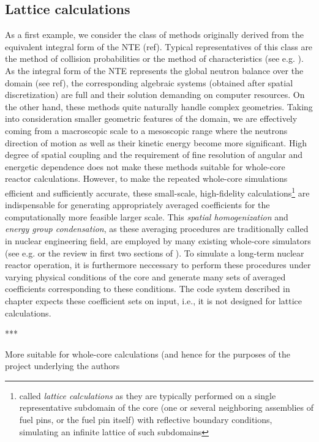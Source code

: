 \subsection{Lattice calculations}
As a first example, we consider the class of
methods originally derived from the equivalent integral form of the NTE (\alert{ref}). Typical representatives of this
class are the method of collision probabilities or the method of characteristics (see e.g.
\cite{Cho2,Wu1,Hursin1,Petkov1,Sanchez1}). As the integral form of the NTE represents the global neutron balance over
the domain (see \alert{ref}), the corresponding algebraic systems (obtained after spatial discretization) are full and
their solution demanding on computer resources. On the other hand, these methods quite naturally handle complex
geometries. Taking into consideration smaller geometric features of the domain, we are effectively coming from a
macroscopic scale to a mesoscopic range where the neutrons direction of motion as well as their kinetic energy become
more significant. High degree of spatial coupling and the requirement of fine resolution of angular and energetic
dependence does not make these methods suitable for whole-core reactor calculations.
However, to make the repeated whole-core simulations efficient and sufficiently accurate, these small-scale,
high-fidelity calculations\footnote{called \textit{lattice calculations} as they are typically performed on a single
representative subdomain of the core (one or several neighboring assemblies of fuel pins, or the fuel pin itself)
with reflective boundary conditions, simulating an infinite lattice of such subdomains} are indispensable for
generating appropriately averaged coefficients for the computationally more feasible larger scale.
This \textit{spatial homogenization} and \textit{energy group condensation}, as these averaging procedures are
traditionally called in nuclear engineering field, are employed by many existing whole-core simulators (see e.g.
\cite[Chap. 17]{Reuss1} or the review in first two sections of \cite{Sanchez7}). To simulate a long-term nuclear reactor
operation, it is furthermore neccessary to perform these procedures under varying physical conditions of the core and
generate many sets of averaged coefficients corresponding to these conditions. The code system described in
\alert{chapter} expects these coefficient sets on input, i.e., it is not designed for lattice calculations.
\begin{center}
***
\end{center}
More suitable for whole-core calculations (and hence for the purposes of the project underlying the authors
